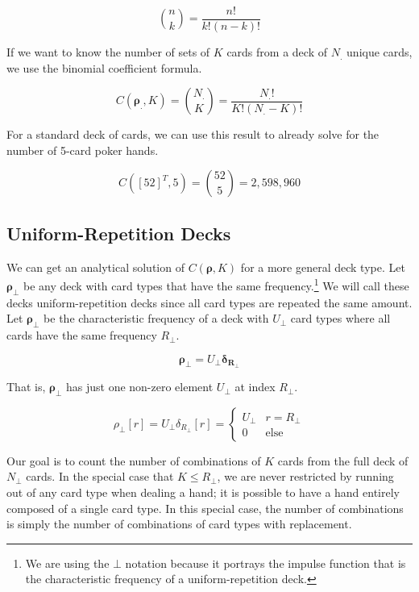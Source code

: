 \documentclass{article}
\begin{document}
\begin{equation}
    \binom{n}{k} = \frac{n!}{k! (n - k)!}
\end{equation}

If we want to know the number of sets of $K$ cards from a deck of $N_.$ unique cards, we use the binomial coefficient formula.

\begin{equation}
    C(\bm{\rho_{.}}, K) = \binom{N_{.}}{K} = \frac{N_{.}!}{K! (N_{.}-K)!}
\end{equation}

For a standard deck of cards, we can use this result to already solve for the number of 5-card poker hands.

\begin{equation}
    C([52]^T, 5) = \binom{52}{5} = 2,598,960
\end{equation}

\subsection{Uniform-Repetition Decks}

We can get an analytical solution of $C(\bm{\rho}, K)$ for a more general deck type. Let $\bm{\rho_{\bot}}$ be any deck with card types that have the same frequency.\footnote{We are using the $\bot$ notation because it portrays the impulse function that is the characteristic frequency of a uniform-repetition deck.} We will call these decks uniform-repetition decks since all card types are repeated the same amount. Let $\bm{\rho_\bot}$ be the characteristic frequency of a deck with $U_\bot$ card types where all cards have the same frequency $R_\bot$.

\begin{equation}
    \bm{\rho_{\bot}} = U_{\bot} \bm{\delta_{R_{\bot}}}
\end{equation}

That is, $\bm{\rho_{\bot}}$ has just one non-zero element $U_\bot$ at index $R_{\bot}$.

\begin{equation}
    \rho_{\bot}[r] = U_{\bot} \delta_{R_{\bot}}[r] = \begin{cases} U_{\bot} & r=R_{\bot} \\ 0 & \text{else}
    \end{cases}
\end{equation}

Our goal is to count the number of combinations of $K$ cards from the full deck of $N_{\bot}$ cards. In the special case that $K\leq R_\bot$, we are never restricted by running out of any card type when dealing a hand; it is possible to have a hand entirely composed of a single card type. In this special case, the number of combinations is simply the number of combinations of card types with replacement.
\end{document}
